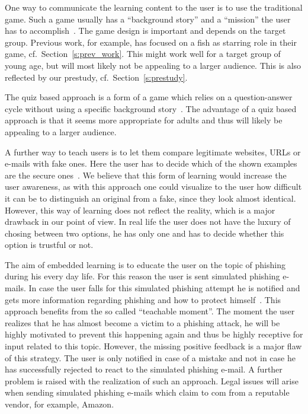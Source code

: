 \begin{description}[leftmargin=0cm]
	\item[Game Based Learning] One way to communicate the learning content to the user is to use the traditional game. Such a game usually has a ``background story'' and a ``mission'' the user has to accomplish~\cite{sheng2007antiphishingphil,antiphishingphyllis}. The game design is important and depends on the target group. Previous work, for example, has focused on a fish as starring role in their game, cf.~Section~\ref{s:prev_work}. This might work well for a target group of young age, but will most likely not be appealing to a larger audience. This is also reflected by our prestudy, cf.~Section~\ref{s:prestudy}.
	\item[Quiz Based Learning] The quiz based approach is a form of a game which relies on a question-answer cycle without using a specific background story~\cite{onguardonline}. The advantage of a quiz based approach is that it seems more appropriate for adults and thus will likely be appealing to a larger audience.
	\item[Comparison Based Learning] A further way to teach users is to let them compare legitimate websites, URLs or e-mails with fake ones. Here the user has to decide which of the shown examples are the secure ones~\cite{staysafeonline}. We believe that this form of learning would increase the user awareness, as with this approach one could visualize to the user how difficult it can be to distinguish an original from a fake, since they look almost identical. However, this way of learning does not reflect the reality, which is a major drawback in our point of view. In real life the user does not have the luxury of chosing between two options, he has only one and has to decide whether this option is trustful or not.
	\item[Emdedded Learning] The aim of embedded learning is to educate the user on the topic of phishing during his every day life. For this reason the user is sent simulated phishing e-mails. In case the user falls for this simulated phishing attempt he is notified and gets more information regarding phishing and how to protect himself~\cite{embedded2011jansson, kumaraguru2009phishguru}. This approach benefits from the so called ``teachable moment''. The moment the user realizes that he has almost become a victim to a phishing attack, he will be highly motivated to prevent this happening again and thus be highly receptive for input related to this topic. However, the missing positive feedback is a major flaw of this strategy. The user is only notified in case of a mistake and not in case he has successfully rejected to react to the simulated phishing e-mail. A further problem is raised with the realization of such an approach. Legal issues will arise when sending simulated phishing e-mails which claim to com from a reputable vendor, for example, Amazon.
\end{description}

